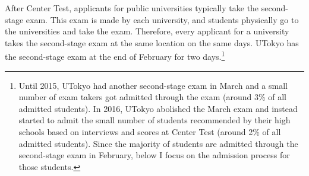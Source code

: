 \documentclass[12pt,letterpaper]{article}
\begin{document}
After Center Test, applicants for public universities typically take the second-stage exam.
This exam is made by each university, and students physically go to the universities and take the exam.
Therefore, every applicant for a university takes the second-stage exam at the same location on the same days.
UTokyo has the second-stage exam at the end of February for two days.\footnote{
  Until 2015, UTokyo had another second-stage exam in March and a small number of exam takers got admitted through the exam (around 3\% of all admitted students).
  In 2016, UTokyo abolished the March exam and instead started to admit the small number of students recommended by their high schools based on interviews and scores at Center Test (around 2\% of all admitted students).
  Since the majority of students are admitted through the second-stage exam in February, below I focus on the admission process for those students. 
}

\end{document}
